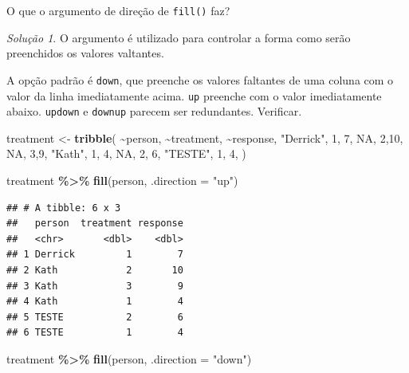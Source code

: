 \documentclass[
]{latex/krantz}
\newenvironment{Shaded}{\begin{snugshade}}{\end{snugshade}}
\newcommand{\AttributeTok}[1]{\textcolor[rgb]{0.13,0.29,0.53}{#1}}
\newcommand{\ConstantTok}[1]{\textcolor[rgb]{0.56,0.35,0.01}{#1}}
\newcommand{\DecValTok}[1]{\textcolor[rgb]{0.00,0.00,0.81}{#1}}
\newcommand{\FunctionTok}[1]{\textcolor[rgb]{0.13,0.29,0.53}{\textbf{#1}}}
\newcommand{\NormalTok}[1]{#1}
\newcommand{\OtherTok}[1]{\textcolor[rgb]{0.56,0.35,0.01}{#1}}
\newcommand{\SpecialCharTok}[1]{\textcolor[rgb]{0.81,0.36,0.00}{\textbf{#1}}}
\newcommand{\StringTok}[1]{\textcolor[rgb]{0.31,0.60,0.02}{#1}}
\theoremstyle{definition}
\theoremstyle{definition}
\theoremstyle{definition}
\theoremstyle{definition}
\theoremstyle{remark}
\newtheorem*{solution}{Solução}
\begin{document}
O que o argumento de direção de \texttt{fill()} faz?

\begin{solution}

O argumento é utilizado para controlar a forma como serão preenchidos os valores valtantes.

A opção padrão é \texttt{down}, que preenche os valores faltantes de uma coluna com o valor da linha imediatamente acima. \texttt{up} preenche com o valor imediatamente abaixo. \texttt{updown} e \texttt{downup} parecem ser redundantes. Verificar.

\begin{Shaded}
\begin{Highlighting}[]
\NormalTok{treatment }\OtherTok{\textless{}{-}} \FunctionTok{tribble}\NormalTok{(}
  \SpecialCharTok{\textasciitilde{}}\NormalTok{person, }\SpecialCharTok{\textasciitilde{}}\NormalTok{treatment, }\SpecialCharTok{\textasciitilde{}}\NormalTok{response,}
  \StringTok{"Derrick"}\NormalTok{, }\DecValTok{1}\NormalTok{, }\DecValTok{7}\NormalTok{,}
  \ConstantTok{NA}\NormalTok{, }\DecValTok{2}\NormalTok{,}\DecValTok{10}\NormalTok{,}
  \ConstantTok{NA}\NormalTok{, }\DecValTok{3}\NormalTok{,}\DecValTok{9}\NormalTok{,}
  \StringTok{"Kath"}\NormalTok{, }\DecValTok{1}\NormalTok{, }\DecValTok{4}\NormalTok{,}
  \ConstantTok{NA}\NormalTok{, }\DecValTok{2}\NormalTok{, }\DecValTok{6}\NormalTok{,}
  \StringTok{"TESTE"}\NormalTok{, }\DecValTok{1}\NormalTok{, }\DecValTok{4}\NormalTok{,}
\NormalTok{)}

\NormalTok{treatment }\SpecialCharTok{\%\textgreater{}\%} \FunctionTok{fill}\NormalTok{(person, }\AttributeTok{.direction =} \StringTok{"up"}\NormalTok{)}
\end{Highlighting}
\end{Shaded}

\begin{verbatim}
## # A tibble: 6 x 3
##   person  treatment response
##   <chr>       <dbl>    <dbl>
## 1 Derrick         1        7
## 2 Kath            2       10
## 3 Kath            3        9
## 4 Kath            1        4
## 5 TESTE           2        6
## 6 TESTE           1        4
\end{verbatim}

\begin{Shaded}
\begin{Highlighting}[]
\NormalTok{treatment }\SpecialCharTok{\%\textgreater{}\%} \FunctionTok{fill}\NormalTok{(person, }\AttributeTok{.direction =} \StringTok{"down"}\NormalTok{)}
\end{Highlighting}
\end{Shaded}


\end{solution}
\end{document}
